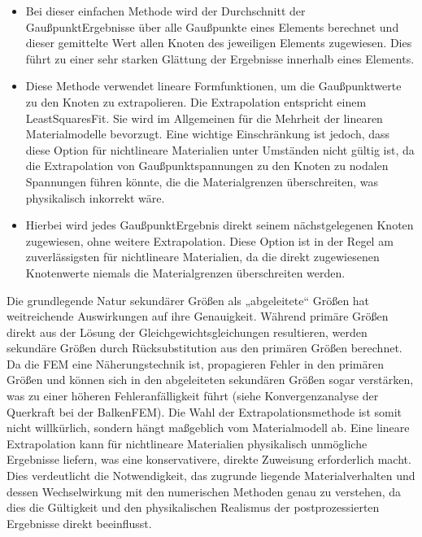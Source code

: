 \documentclass[letterpaper,10pt,german]{jupyterBook}
\begin{document}
\begin{itemize}
\item {} 
\sphinxAtStartPar
{} Bei dieser einfachen Methode wird der Durchschnitt der Gaußpunkt\sphinxhyphen{}Ergebnisse über alle Gaußpunkte eines Elements berechnet und dieser gemittelte Wert allen Knoten des jeweiligen Elements zugewiesen. Dies führt zu einer sehr starken Glättung der Ergebnisse innerhalb eines Elements.

\item {} 
\sphinxAtStartPar
{} Diese Methode verwendet lineare Formfunktionen, um die Gaußpunktwerte zu den Knoten zu extrapolieren. Die Extrapolation entspricht einem Least\sphinxhyphen{}Squares\sphinxhyphen{}Fit. Sie wird im Allgemeinen für die Mehrheit der linearen Materialmodelle bevorzugt. Eine wichtige Einschränkung ist jedoch, dass diese Option für nichtlineare Materialien unter Umständen nicht gültig ist, da die Extrapolation von Gaußpunktspannungen zu den Knoten zu nodalen Spannungen führen könnte, die die Materialgrenzen überschreiten, was physikalisch inkorrekt wäre.

\item {} 
\sphinxAtStartPar
{} Hierbei wird jedes Gaußpunkt\sphinxhyphen{}Ergebnis direkt seinem nächstgelegenen Knoten zugewiesen, ohne weitere Extrapolation. Diese Option ist in der Regel am zuverlässigsten für nichtlineare Materialien, da die direkt zugewiesenen Knotenwerte niemals die Materialgrenzen überschreiten werden.

\end{itemize}

\sphinxAtStartPar
Die grundlegende Natur sekundärer Größen als „abgeleitete“ Größen hat weitreichende Auswirkungen auf ihre Genauigkeit. Während primäre Größen direkt aus der Lösung der Gleichgewichtsgleichungen resultieren, werden sekundäre Größen durch Rücksubstitution aus den primären Größen berechnet. Da die FEM eine Näherungstechnik ist, propagieren Fehler in den primären Größen und können sich in den abgeleiteten sekundären Größen sogar verstärken, was zu einer höheren Fehleranfälligkeit führt (siehe Konvergenzanalyse der Querkraft bei der Balken\sphinxhyphen{}FEM). Die Wahl der Extrapolationsmethode ist somit nicht willkürlich, sondern hängt maßgeblich vom Materialmodell ab. Eine lineare Extrapolation kann für nichtlineare Materialien physikalisch unmögliche Ergebnisse liefern, was eine konservativere, direkte Zuweisung erforderlich macht. Dies verdeutlicht die Notwendigkeit, das zugrunde liegende Materialverhalten und dessen Wechselwirkung mit den numerischen Methoden genau zu verstehen, da dies die Gültigkeit und den physikalischen Realismus der postprozessierten Ergebnisse direkt beeinflusst.
\end{document}
